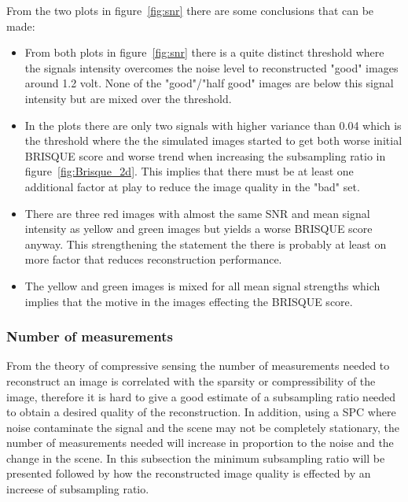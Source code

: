 From the two plots in figure~\ref{fig:snr} there are some conclusions that can be made:


\begin{itemize}
\item From both plots in figure~\ref{fig:snr} there is a quite distinct threshold where the signals intensity overcomes the noise level to reconstructed "good" images around 1.2 volt. None of the "good"/"half good" images are below this signal intensity but are mixed over the threshold. 

\item In the plots there are only two signals with higher variance than 0.04 which is the threshold where the the simulated images started to get both worse initial BRISQUE score and worse trend when increasing the subsampling ratio in figure~\ref{fig:Brisque_2d}. This implies that there must be at least one additional factor at play to reduce the image quality in the "bad" set. 


\item There are three red images with almost the same SNR and mean signal intensity as yellow and green images but yields a worse BRISQUE score anyway. This strengthening the statement the there is probably at least on more factor that reduces reconstruction performance.

\item The yellow and green images is mixed for all mean signal strengths which implies that the motive in the images effecting the  BRISQUE score. 

\end{itemize}




\pagebreak

\subsubsection{Number of measurements}
\label{sec:measurements}
From the theory of compressive sensing the number of measurements needed to reconstruct an image is correlated with the sparsity or compressibility of the image, therefore it is hard to give a good estimate of a subsampling ratio needed to obtain a desired quality of the reconstruction. In addition, using a SPC where noise contaminate the signal and the scene may not be completely stationary, the number of measurements needed will increase in proportion to the noise and the change in the scene. In this subsection the minimum subsampling ratio will be presented followed by how the reconstructed image quality is effected by an increese of subsampling ratio.\\[0.1in]


